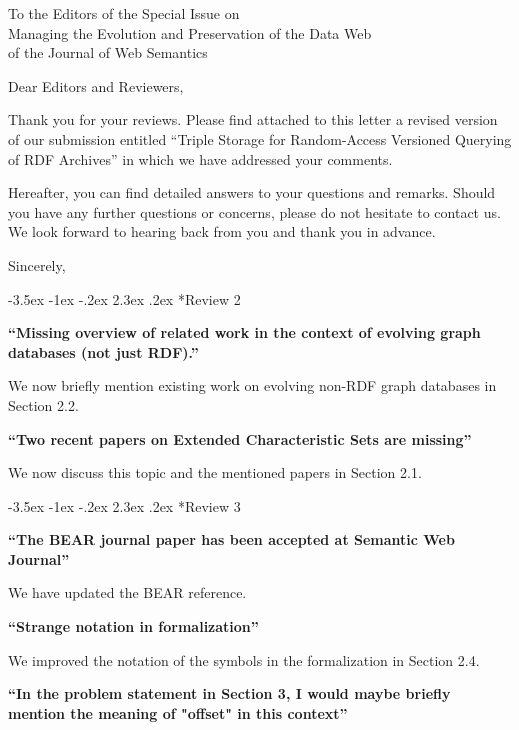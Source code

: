\documentclass{letter}
\makeatletter
\newcounter{section}
\newcommand\section{\@startsection {section}{1}{\z@}%
                                   {-3.5ex \@plus -1ex \@minus -.2ex}%
                                   {2.3ex \@plus.2ex}%
                                   {\normalfont\Large\bfseries}}
\makeatother
\begin{document}
\begin{letter}{To the Editors of the Special Issue on\\Managing the Evolution and Preservation of the Data Web\\of the Journal of Web Semantics}

\opening{Dear Editors and Reviewers,}

\bigskip

Thank you for your reviews.
Please find attached to this letter a revised version of our submission entitled
\enquote{Triple Storage for Random-Access Versioned Querying of RDF Archives}
in which we have addressed your comments.

\bigskip

Hereafter, you can find detailed answers to your questions and remarks.
Should you have any further questions or concerns, please do not hesitate to contact us.
We look forward to hearing back from you and thank you in advance.

\bigskip

\closing{Sincerely,}

\pagebreak
\section*{Review 2}

\textbf{\enquote{Missing overview of related work in the context of evolving graph databases (not just RDF).}}

We now briefly mention existing work on evolving non-RDF graph databases in Section 2.2.

\textbf{\enquote{Two recent papers on Extended Characteristic Sets are missing}}

We now discuss this topic and the mentioned papers in Section 2.1.

\section*{Review 3}

\textbf{\enquote{The BEAR journal paper has been accepted at Semantic Web Journal}}

We have updated the BEAR reference.

\textbf{\enquote{Strange notation in formalization}}

We improved the notation of the symbols in the formalization in Section 2.4.

\textbf{\enquote{In the problem statement in Section 3, I would maybe briefly mention the meaning of "offset" in this context}}


\end{letter}
\end{document}
